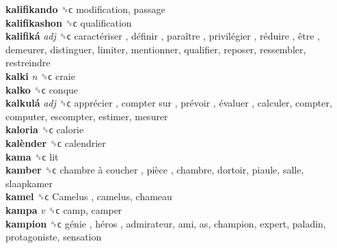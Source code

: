 \textbf{kalifikando} ␝ϲ  modification, passage  \\
\textbf{kalifikashon} ␝ϲ  qualification  \\
\textbf{kalifiká} \emph{adj}  ␝ϲ   caractériser ,  définir ,  paraître ,  privilégier ,  réduire ,  être , demeurer, distinguer, limiter, mentionner, qualifier, reposer, ressembler, restreindre  \\
\textbf{kalki} \emph{n}  ␝ϲ  craie  \\
\textbf{kalko} ␝ϲ  conque  \\
\textbf{kalkulá} \emph{adj}  ␝ϲ   apprécier ,  compter sur ,  prévoir ,  évaluer , calculer, compter, computer, escompter, estimer, mesurer  \\
\textbf{kaloria} ␝ϲ  calorie  \\
\textbf{kalènder} ␝ϲ  calendrier  \\
\textbf{kama} ␝ϲ  lit  \\
\textbf{kamber} ␝ϲ   chambre à coucher ,  pièce , chambre, dortoir, piaule, salle, slaapkamer  \\
\textbf{kamel} ␝ϲ   Camelus , camelus, chameau  \\
\textbf{kampa} \emph{v}  ␝ϲ  camp, camper  \\
\textbf{kampion} ␝ϲ   génie ,  héros , admirateur, ami, as, champion, expert, paladin, protagoniste, sensation  \\
